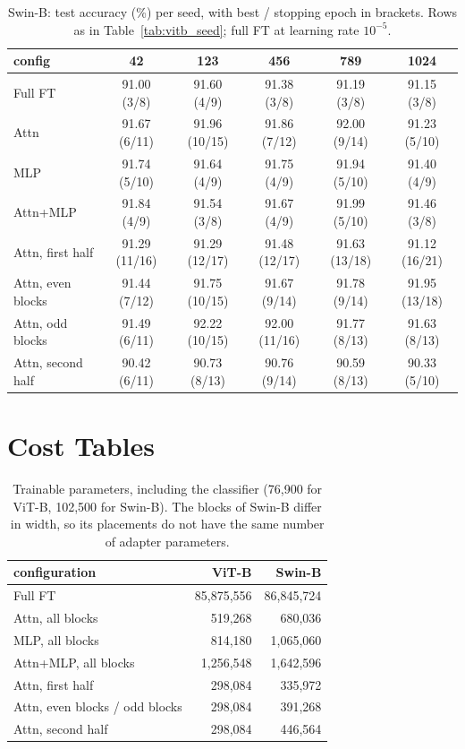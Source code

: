 \begin{table}[H]
\centering\footnotesize
\setlength{\tabcolsep}{3.5pt}
\begin{tabular}{lccccc}
\toprule
config & 42 & 123 & 456 & 789 & 1024 \\
\midrule
Full FT & 91.00 (3/8) & 91.60 (4/9) & 91.38 (3/8) & 91.19 (3/8) & 91.15 (3/8) \\
Attn & 91.67 (6/11) & 91.96 (10/15) & 91.86 (7/12) & 92.00 (9/14) & 91.23 (5/10) \\
MLP & 91.74 (5/10) & 91.64 (4/9) & 91.75 (4/9) & 91.94 (5/10) & 91.40 (4/9) \\
Attn+MLP & 91.84 (4/9) & 91.54 (3/8) & 91.67 (4/9) & 91.99 (5/10) & 91.46 (3/8) \\
Attn, first half & 91.29 (11/16) & 91.29 (12/17) & 91.48 (12/17) & 91.63 (13/18) & 91.12 (16/21) \\
Attn, even blocks & 91.44 (7/12) & 91.75 (10/15) & 91.67 (9/14) & 91.78 (9/14) & 91.95 (13/18) \\
Attn, odd blocks & 91.49 (6/11) & 92.22 (10/15) & 92.00 (11/16) & 91.77 (8/13) & 91.63 (8/13) \\
Attn, second half & 90.42 (6/11) & 90.73 (8/13) & 90.76 (9/14) & 90.59 (8/13) & 90.33 (5/10) \\
\bottomrule
\end{tabular}
\caption{Swin-B: test accuracy (\%) per seed, with best / stopping epoch in brackets. Rows as in
Table~\ref{tab:vitb_seed}; full FT at learning rate $10^{-5}$.}
\label{tab:swin_seed}
\end{table}



\chapter{Cost Tables}
\label{app:cost}

\begin{table}[H]
\centering\small
\begin{tabular}{lrr}
\toprule
configuration & ViT-B & Swin-B \\
\midrule
Full FT & 85,875,556 & 86,845,724 \\
Attn, all blocks & 519,268 & 680,036 \\
MLP, all blocks & 814,180 & 1,065,060 \\
Attn+MLP, all blocks & 1,256,548 & 1,642,596 \\
Attn, first half & 298,084 & 335,972 \\
Attn, even blocks / odd blocks & 298,084 & 391,268 \\
Attn, second half & 298,084 & 446,564 \\
\bottomrule
\end{tabular}
\caption{Trainable parameters, including the classifier (76,900 for ViT-B, 102,500 for Swin-B). The blocks of
Swin-B differ in width, so its placements do not have the same number of adapter parameters.}
\label{tab:params}
\end{table}

